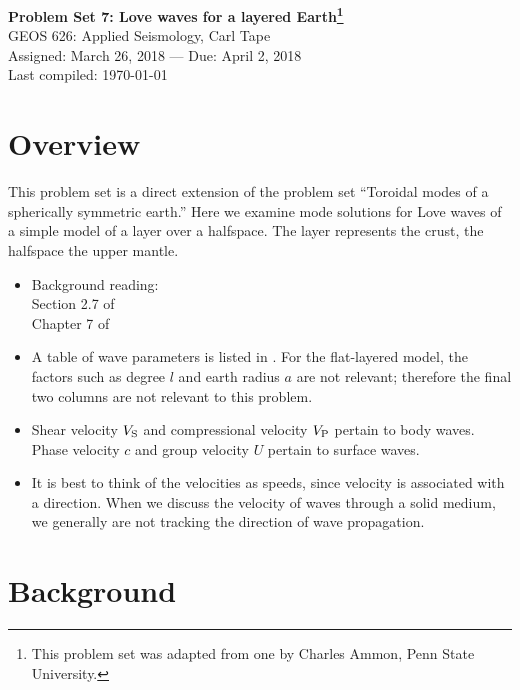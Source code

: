 \documentclass[11pt,titlepage,fleqn]{article}
\begin{document}

\begin{spacing}{1.2}
\centering
{\large \bf Problem Set 7: Love waves for a layered Earth\footnote{This problem set was adapted from one by Charles Ammon, Penn State University.}} \\
GEOS 626: Applied Seismology, Carl Tape \\
Assigned: March 26, 2018 --- Due: April 2, 2018 \\
Last compiled: \today
\end{spacing}


\section*{Overview}

This problem set is a direct extension of the problem set ``Toroidal modes of a spherically symmetric earth.'' Here we examine mode solutions for Love waves of a simple model of a layer over a halfspace. The layer represents the crust, the halfspace the upper mantle.

\begin{itemize}
\item Background reading: \\
Section 2.7 of \citet{SteinWysession} \\
Chapter 7 of \citet{AkiRichardsE2}

\item A table of wave parameters is listed in . For the flat-layered model, the factors such as degree $l$ and earth radius $a$ are not relevant; therefore the final two columns are not relevant to this problem.

\item Shear velocity $V_{\rm S}$ and compressional velocity $V_{\rm P}$ pertain to body waves. Phase velocity $c$ and group velocity $U$ pertain to surface waves.

\item It is best to think of the velocities as speeds, since velocity is associated with a direction. When we discuss the velocity of waves through a solid medium, we generally are not tracking the direction of wave propagation.

\end{itemize}


\section*{Background}
\end{document}
